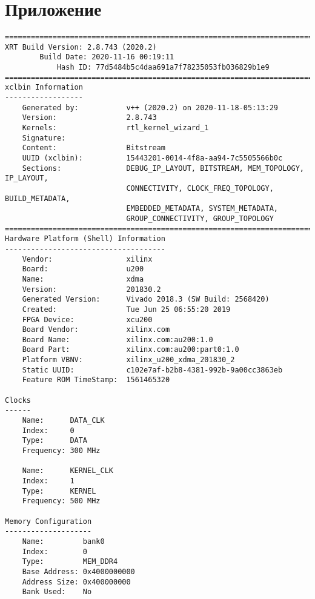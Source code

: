 \chapter*{Приложение}


\begin{center}
    \captionsetup{justification=raggedright,singlelinecheck=off}
    \begin{lstlisting}[label=lst:xclbin_info,caption=Файл vinc.xclbin.info]
==============================================================================
XRT Build Version: 2.8.743 (2020.2)
        Build Date: 2020-11-16 00:19:11
            Hash ID: 77d5484b5c4daa691a7f78235053fb036829b1e9
==============================================================================
xclbin Information
------------------
    Generated by:           v++ (2020.2) on 2020-11-18-05:13:29
    Version:                2.8.743
    Kernels:                rtl_kernel_wizard_1
    Signature:              
    Content:                Bitstream
    UUID (xclbin):          15443201-0014-4f8a-aa94-7c5505566b0c
    Sections:               DEBUG_IP_LAYOUT, BITSTREAM, MEM_TOPOLOGY, IP_LAYOUT, 
                            CONNECTIVITY, CLOCK_FREQ_TOPOLOGY, BUILD_METADATA, 
                            EMBEDDED_METADATA, SYSTEM_METADATA, 
                            GROUP_CONNECTIVITY, GROUP_TOPOLOGY
==============================================================================
Hardware Platform (Shell) Information
-------------------------------------
    Vendor:                 xilinx
    Board:                  u200
    Name:                   xdma
    Version:                201830.2
    Generated Version:      Vivado 2018.3 (SW Build: 2568420)
    Created:                Tue Jun 25 06:55:20 2019
    FPGA Device:            xcu200
    Board Vendor:           xilinx.com
    Board Name:             xilinx.com:au200:1.0
    Board Part:             xilinx.com:au200:part0:1.0
    Platform VBNV:          xilinx_u200_xdma_201830_2
    Static UUID:            c102e7af-b2b8-4381-992b-9a00cc3863eb
    Feature ROM TimeStamp:  1561465320

Clocks
------
    Name:      DATA_CLK
    Index:     0
    Type:      DATA
    Frequency: 300 MHz

    Name:      KERNEL_CLK
    Index:     1
    Type:      KERNEL
    Frequency: 500 MHz

Memory Configuration
--------------------
    Name:         bank0
    Index:        0
    Type:         MEM_DDR4
    Base Address: 0x4000000000
    Address Size: 0x400000000
    Bank Used:    No


\end{lstlisting}
\end{center}
